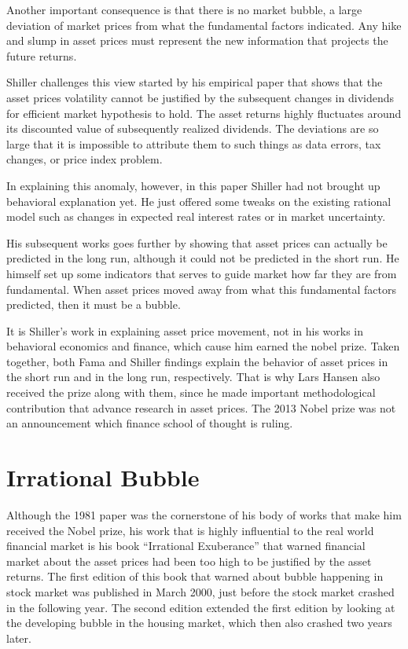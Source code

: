 \documentclass[a4paper, 12pt]{article}
\begin{document}
Another important consequence is that there is no market bubble, a large deviation of market prices from what the fundamental factors indicated. Any hike and slump in asset prices must represent the new information that projects the future returns.  

Shiller challenges this view started by his empirical paper \citep{shiller1981stock} that shows that the asset prices volatility cannot be justified by the subsequent changes in dividends for efficient market hypothesis to hold. The asset returns highly fluctuates around its discounted value of subsequently realized dividends. The deviations are so large that it is impossible to attribute them to such things as data errors, tax changes, or price index problem. 

In explaining this anomaly, however, in this paper Shiller had not brought up behavioral explanation yet. He just offered some tweaks on the existing rational model such as changes in expected real interest rates or in market uncertainty.

His subsequent works goes further by showing that asset prices can actually be predicted in the long run, although it could not be predicted in the short run. He himself set up some indicators that serves to guide market how far they are from fundamental. When asset prices moved away from what this fundamental factors predicted, then it must be a bubble.

It is Shiller's work in explaining asset price movement, not in his works in behavioral economics and finance, which cause him earned the nobel prize. Taken together, both Fama and Shiller findings explain the behavior of asset prices in the short run and in the long run, respectively. That is why Lars Hansen also received the prize along with them, since he made important methodological contribution that advance research in asset prices. The 2013 Nobel prize was not an announcement which finance school of thought is ruling. 

\section{Irrational Bubble}

Although the 1981 paper was the cornerstone of his body of works that make him received the Nobel prize, his work that is highly influential to the real world financial market is his book ``Irrational Exuberance'' that warned financial market about the asset prices had been too high to be justified by the asset returns. The first edition of this book that warned about bubble happening in stock market was published in March 2000, just before the stock market crashed in the following year. The second edition \citep{shiller2005irrational} extended the first edition by looking at the developing bubble in the housing market, which then also crashed two years later.
\end{document}
